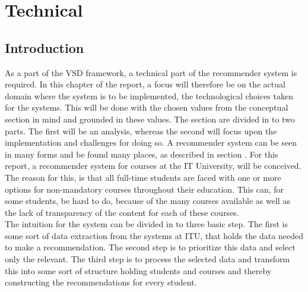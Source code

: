
 
\section{Technical}

\subsection{Introduction}
As a part of the VSD framework, a technical part of the recommender system is required. In this chapter of the report, a focus will therefore be on the actual domain where the system is to be implemented, the technological choices taken for the systems. This will be done with the chosen values from the conceptual section in mind and grounded in these values. 
The section are divided in to two parts. The first will be an analysis, whereas the second will focus upon the implementation and challenges for doing so. 
A recommender system can be seen in many forms and be found many places, as described in section . For this report, a recommender system for courses at the IT University, will be conceived. The reason for this, is that all full-time students are faced with one or more options for non-mandatory courses throughout their education. This can, for some students, be hard to do, because of the many courses available as well as the lack of transparency of the content for each of these courses.\\

The intuition for the system can be divided in to three basic step. The first is some sort of data extraction from the systems at ITU, that holds the data needed to make a recommendation. The second step is to prioritize this data and select only the relevant. The third step is to process the selected data and transform this into some sort of structure holding students and courses and thereby constructing the recommendations for every student.


